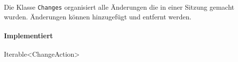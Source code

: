 Die Klasse \verb#Changes# organisiert alle Änderungen die in einer Sitzung gemacht wurden.
Änderungen können hinzugefügt und entfernt werden.

\paragraph*{Implementiert}
Iterable<ChangeAction>